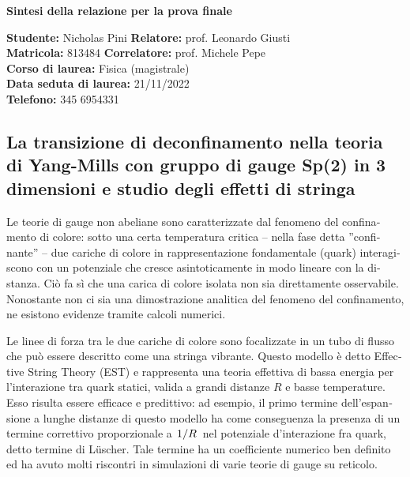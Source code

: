 \documentclass[reqno,11pt]{article}
\numberwithin{equation}{section}
\begin{document}
\begin{otherlanguage}{italian}

\pagestyle{empty}
    \begin{center}
        \textbf{\huge{Sintesi della relazione per la prova finale}} 
    \end{center}
    \medskip
    \textbf{Studente:} Nicholas Pini \hfill \textbf{Relatore:} prof. Leonardo Giusti \\
    \textbf{Matricola:} 813484       \hfill \textbf{Correlatore:} prof. Michele Pepe \\
    \textbf{Corso di laurea:} Fisica (magistrale) \\
	\textbf{Data seduta di laurea:} 21/11/2022 \\
    \textbf{Telefono:} 345 6954331

\subsection*{La transizione di deconfinamento nella teoria di Yang-Mills con gruppo di gauge Sp(2) in 3 dimensioni e studio degli effetti di stringa}
Le teorie di gauge non abeliane sono caratterizzate dal fenomeno del confinamento di colore: sotto una certa temperatura 
critica -- nella fase detta ”confinante” -- due cariche di colore in rappresentazione fondamentale (quark) interagiscono con un 
potenziale che cresce asintoticamente in modo lineare con la distanza. Ciò fa sì che una carica di colore isolata non sia 
direttamente osservabile. Nonostante non ci sia una dimostrazione analitica del fenomeno del confinamento, ne esistono evidenze 
tramite calcoli numerici.

Le linee di forza tra le due cariche di colore sono focalizzate in un tubo di flusso che può essere descritto come una stringa 
vibrante. Questo modello è detto Effective String Theory (EST) e rappresenta una teoria effettiva di bassa energia per 
l’interazione tra quark statici, valida a grandi distanze $R$ e basse temperature. Esso risulta essere efficace e predittivo: 
ad esempio, il primo termine dell’espansione a lunghe distanze di questo modello ha come conseguenza la presenza di un termine 
correttivo proporzionale a $\flatfrac{1}{R}$ nel potenziale d’interazione fra quark, detto termine di L{\"u}scher. Tale termine
ha un coefficiente numerico ben definito ed ha avuto molti riscontri in simulazioni di varie teorie di gauge su reticolo.


\end{otherlanguage}
\end{document}
